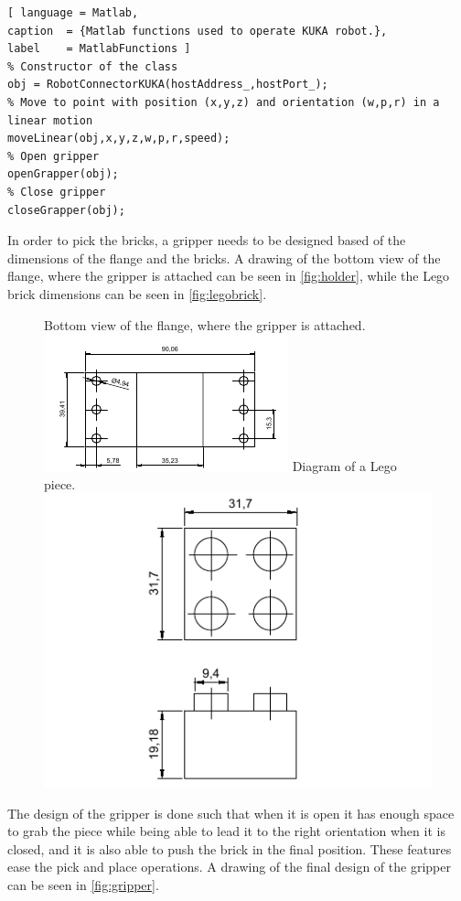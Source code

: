 \begin{lstlisting}[ language = Matlab,
caption  = {Matlab functions used to operate KUKA robot.},
label    = MatlabFunctions ]
% Constructor of the class
obj = RobotConnectorKUKA(hostAddress_,hostPort_);
% Move to point with position (x,y,z) and orientation (w,p,r) in a linear motion
moveLinear(obj,x,y,z,w,p,r,speed);
% Open gripper
openGrapper(obj);
% Close gripper
closeGrapper(obj);
\end{lstlisting}

In order to pick the bricks, a gripper needs to be designed based of the dimensions of the flange and the bricks. A drawing of the bottom view of the flange, where the gripper is attached can be seen in \autoref{fig:holder}, while the Lego brick dimensions can be seen in \autoref{fig:legobrick}.

\begin{figure}[H]
    \captionbox
    {
        Bottom view of the flange, where the gripper is attached.
        \label{fig:holder}                                 
    }                                                                 
    {                                                                  
        \includegraphics[width=.4\textwidth]{figures/holder}         
    }                                                                   
    \hspace{5pt}
    \captionbox
    {
        Diagram of a Lego piece.
        \label{fig:legobrick}                                     
    }                                                                           
    {                                                                            
        \includegraphics[width=.4\textwidth]{figures/LegoPiece}            
    }                                                                            
\end{figure}
The design of the gripper is done such that when it is open it has enough space to grab the piece while being able to lead it to the right orientation when it is closed, and it is also able to push the brick in the final position. These features ease the pick and place operations. A drawing of the final design of the gripper can be seen in \autoref{fig:gripper}.


